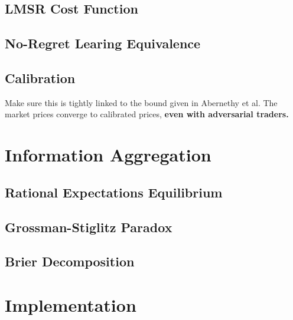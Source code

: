 \documentclass[11pt, a4paper]{article}
\theoremstyle{definition}
\begin{document}
\subsection{LMSR Cost Function}
\subsection{No-Regret Learing Equivalence}
\subsection{Calibration}
Make sure this is tightly linked to the bound given in Abernethy et al. 
The market prices converge to calibrated prices, \textbf{even with adversarial traders.}

\section{Information Aggregation}
\subsection{Rational Expectations Equilibrium}

\subsection{Grossman-Stiglitz Paradox}


\subsection{Brier Decomposition}


\section{Implementation}
\end{document}

